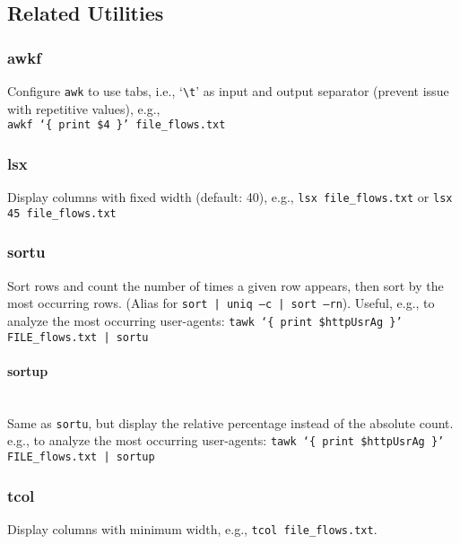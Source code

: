\documentclass[documentation]{subfiles}
\begin{document}
\subsection{Related Utilities}

\subsubsection{awkf}\label{awkf}
Configure {\tt awk} to use tabs, i.e., `{\tt\textbackslash{}t}' as input and output separator (prevent issue with repetitive values), e.g.,\\
{\tt awkf `\{ print \$4 \}' file\_flows.txt}

\subsubsection{lsx}
Display columns with fixed width (default: 40), e.g., {\tt lsx file\_flows.txt} or {\tt lsx 45 file\_flows.txt}

\subsubsection{sortu}
Sort rows and count the number of times a given row appears, then sort by the most occurring rows.
(Alias for {\tt sort | uniq --c | sort --rn}).
Useful, e.g., to analyze the most occurring user-agents: {\tt tawk `\{ print \$httpUsrAg \}' FILE\_flows.txt | sortu}

\paragraph{sortup}~\\
Same as {\tt sortu}, but display the relative percentage instead of the absolute count.
e.g., to analyze the most occurring user-agents: {\tt tawk `\{ print \$httpUsrAg \}' FILE\_flows.txt | sortup}

\subsubsection{tcol}
Display columns with minimum width, e.g., {\tt tcol file\_flows.txt}.
\end{document}
